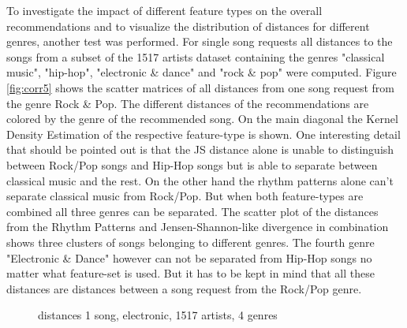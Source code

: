 \noindent To investigate the impact of different feature types on the overall recommendations and to visualize the distribution of distances for different genres, another test was performed. For single song requests all distances to the songs from a subset of the 1517 artists dataset containing the genres "classical music", "hip-hop", "electronic \& dance" and "rock \& pop" were computed. Figure \ref{fig:corr5} shows the scatter matrices of all distances from one song request from the genre Rock \& Pop. The different distances of the recommendations are colored by the genre of the recommended song. 
\noindent On the main diagonal the Kernel Density Estimation of the respective feature-type is shown. One interesting detail that should be pointed out is that the JS distance alone is unable to distinguish between Rock/Pop songs and Hip-Hop songs but is able to separate between classical music and the rest. On the other hand the rhythm patterns alone can't separate classical music from Rock/Pop. But when both feature-types are combined all three genres can be separated. The scatter plot of the distances from the Rhythm Patterns and Jensen-Shannon-like divergence in combination shows three clusters of songs belonging to different genres. The fourth genre "Electronic \& Dance" however can not be separated from Hip-Hop songs no matter what feature-set is used. But it has to be kept in mind that all these distances are distances between a song request from the Rock/Pop genre. 

\begin{figure}[htbp]
	\centering
	\caption{distances 1 song, electronic, 1517 artists, 4 genres}
	\label{fig:corr6}
\end{figure}
\FloatBarrier

